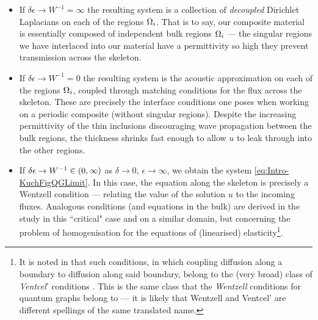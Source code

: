 \begin{itemize}
	\item If $\delta\epsilon\rightarrow W^{-1}=\infty$ the resulting system is a collection of \emph{decoupled} Dirichlet Laplacians on each of the regions $\Omega_i$.
	That is to say, our composite material is essentially composed of independent bulk regions $\Omega_i$ --- the singular regions we have interlaced into our material have a permittivity so high they prevent transmission across the skeleton.
	\item If $\delta\epsilon\rightarrow W^{-1}=0$ the resulting system is the acoustic approximation on each of the regions $\Omega_i$, coupled through matching conditions for the flux across the skeleton.
	These are precisely the interface conditions one poses when working on a periodic composite (without singular regions).
	Despite the increasing permittivity of the thin inclusions discouraging wave propagation between the bulk regions, the thickness shrinks fast enough to allow $u$ to leak through into the other regions.
	\item If $\delta\epsilon\rightarrow W^{-1}\in\left( 0,\infty \right)$ as $\delta\rightarrow0$, $\epsilon\rightarrow\infty$, we obtain the system \eqref{eq:Intro-KuchFigQGLimit}.
	In this case, the equation along the skeleton is precisely a Wentzell condition --- relating the value of the solution $u$ to the incoming fluxes.
	Analogous conditions (and equations in the bulk) are derived in the study \cite{cherednichenko2019homogenisation} in this ``critical" case and on a similar domain, but concerning the problem of homogenisation for the equations of (linearised) elasticity\footnote{It is noted in \cite{cherednichenko2019homogenisation} that such conditions, in which coupling diffusion along a boundary to diffusion along said boundary, belong to the (very broad) class of \emph{Ventcel}' conditions \cite{venttsel1959boundary}. This is the same class that the \emph{Wentzell} conditions for quantum graphs belong to --- it is likely that Wentzell and Ventcel' are different spellings of the same translated name.}.
\end{itemize}

